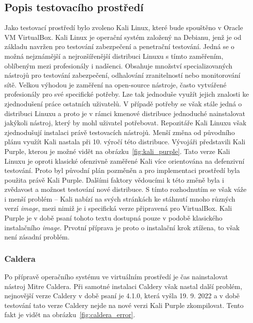 \subsection{Popis testovacího prostředí}\label{subsec:popis-testovaciho-prostredi}
Jako testovací prostředí bylo zvoleno Kali Linux, které bude spouštěno v Oracle VM VirtualBox.
Kali Linux je operační systém založený na Debianu, jenž je od základu navržen pro testování zabezpečení a penetrační testování.
Jedná se o možná nejznámější a nejrozšířenější distribuci Linuxu s tímto zaměřením, oblíbeným mezi profesionály i nadšenci.
Obsahuje množství specializovaných nástrojů pro testování zabezpečení, odhalování zranitelností nebo monitorování sítě.
Velkou výhodou je zaměření na open-source nástroje, často vytvářené profesionály pro své specifické potřeby.
Lze tak jednoduše využít jejich znalosti ke zjednodušení práce ostatních uživatelů.
V případě potřeby se však stále jedná o distribuci Linuxu a proto je v rámci kmenové distribuce jednoduché nainstalovat jakýkoli nástroj, který by mohl uživatel potřebovat.
Repozitáře Kali Linuxu však zjednodušují instalaci právě testovacích nástrojů.\cite{kali_mainpage}
Menší změna od původního plánu využít Kali nastala při 10. výročí této distribuce\cite{kali_purple}.
Vývojáři představili Kali Purple, kterou je možné vidět na obrázku~\ref{fig:kali_purple}.
Tato verze Kali Linuxu je oproti klasické ofenzivně zaměřené Kali více orientována na defenzivní testování.
Proto byl původní plán pozměněn a pro implementaci prostředí byla použita právě Kali Purple.
Dalšími faktory vědoucími k této změně byla i zvědavost a možnost testování nové distribuce.
S tímto rozhodnutím se však váže i menší problém -- Kali nabízí na svých stránkách ke stáhnutí mnoho různých verzí \textit{image}, mezi nimiž je i specifická verze připravená pro VirtualBox.
Kali Purple je v době psaní tohoto textu dostupná pouze v podobě klasického instalačního \textit{image}.
Prvotní příprava je proto o instalační krok ztížena, to však není zásadní problém.


\subsubsection{Caldera}
Po přípravě operačního systému ve virtuálním prostředí je čas nainstalovat nástroj Mitre Caldera.
Při samotné instalaci Caldery však nastal další problém, nejnovější verze Caldery v době psaní je 4.1.0, která vyšla 19. 9. 2022 a v době testování tato verze Caldery nejde na nové verzi Kali Purple zkompilovat.
Tento fakt je vidět na obrázku~\ref{fig:caldera_error}.

